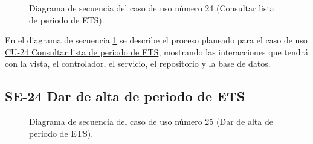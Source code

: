 \begin{figure}[htbp!]
	\begin{center}
		\caption{Diagrama de secuencia del caso de uso número 24 (Consultar lista de periodo de ETS).}
		\label{fig:Diagrama de secuencia CU-24}
	\end{center}
\end{figure}

En el diagrama de secuencia \ref{fig:Diagrama de secuencia CU-24} se describe el proceso planeado para el caso de uso \hyperlink{CU-24}{CU-24 Consultar lista de periodo de ETS}, mostrando las interacciones que tendrá con la vista, el controlador, el servicio, el repositorio y la base de datos.

\newpage

\subsection{SE-24 Dar de alta de periodo de ETS}

\begin{figure}[htbp!]
	\begin{center}
		\caption{Diagrama de secuencia del caso de uso número 25 (Dar de alta de periodo de ETS).}
		\label{fig:Diagrama de secuencia CU-25}
	\end{center}
\end{figure}

